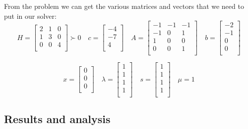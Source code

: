 \documentclass{article}
\begin{document}
From the problem we can get the various matrices and vectors that we need to put in our solver:
\begin{equation*}
H=
 \begin{bmatrix}
2 & 1 & 0 \\
1 & 3 & 0\\
0 & 0 & 4\\
\end{bmatrix} \succ 0
\quad c=
 \begin{bmatrix}
-4 \\
-7\\
4\\
\end{bmatrix} 
\quad A=
 \begin{bmatrix}
-1 & -1 & -1\\
 -1 & 0 & 1\\
 1 & 0 & 0\\
 0 & 0 & 1\\
\end{bmatrix} 
\quad b=
 \begin{bmatrix}
-2 \\
-1\\
 0\\
 0 \\
\end{bmatrix}
\end{equation*}


\begin{equation*}
x=
 \begin{bmatrix}
0\\
0\\
0\\
\end{bmatrix} 
\quad \lambda=
 \begin{bmatrix}
 1 \\
 1\\
 1\\
 1\\
\end{bmatrix} 
\quad s=
 \begin{bmatrix}
 1 \\
 1\\
 1\\
 1\\
\end{bmatrix} 
\quad \mu=1
\end{equation*}

\newpage

\subsection{Results and analysis}
\end{document}
